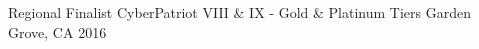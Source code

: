 \begin{cvhonors}
  \cvhonor
    {Regional Finalist} %
    {CyberPatriot VIII \& IX - Gold \& Platinum Tiers} %
    {Garden Grove, CA} %
    {2016} %
\end{cvhonors}